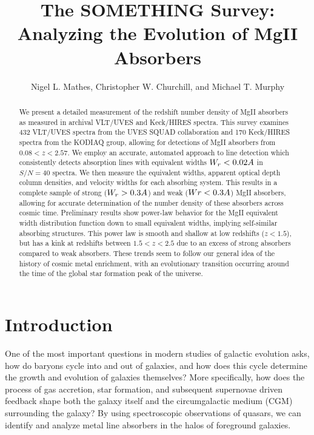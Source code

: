 \documentclass[iop,apj,numberedappendix,appendixfloats,twocolappendix]{emulateapj}
\begin{document}
\title{The SOMETHING Survey: Analyzing the Evolution of MgII Absorbers}

\author{
Nigel L. Mathes,
Christopher W. Churchill,
and
Michael T. Murphy
}


\begin{abstract}
We present a detailed measurement of the redshift number density of MgII absorbers as measured in archival VLT/UVES and Keck/HIRES spectra. This survey examines 432 VLT/UVES spectra from the UVES SQUAD collaboration and 170 Keck/HIRES spectra from the KODIAQ group, allowing for detections of MgII absorbers from $0.08 < z < 2.57$. We employ an accurate, automated approach to line detection which consistently detects absorption lines with equivalent widths $W_r < 0.02\AA$ in $S/N = 40$ spectra. We then measure the equivalent widths, apparent optical depth column densities, and velocity widths for each absorbing system. This results in a complete sample of strong ($W_r > 0.3\AA$) and weak ($Wr < 0.3\AA$) MgII absorbers, allowing for accurate determination of the number density of these absorbers across cosmic time. Preliminary results show power-law behavior for the MgII equivalent width distribution function down to small equivalent widths, implying self-similar absorbing structures. This power law is smooth and shallow at low redshifts ($z < 1.5$), but has a kink at redshifts between $1.5 < z < 2.5$ due to an excess of strong absorbers compared to weak absorbers. These trends seem to follow our general idea of the history of cosmic metal enrichment, with an evolutionary transition occurring around the time of the global star formation peak of the universe.

\end{abstract}



\section{Introduction}
\label{sec:intro}

One of the most important questions in modern studies of galactic evolution asks, how do baryons cycle into and out of galaxies, and how does this cycle determine the growth and evolution of galaxies themselves? More specifically, how does the process of gas accretion, star formation, and subsequent supernovae driven feedback shape both the galaxy itself and the circumgalactic medium (CGM) surrounding the galaxy? By using spectroscopic observations of quasars, we can identify and analyze metal line absorbers in the halos of foreground galaxies. 
\end{document}
